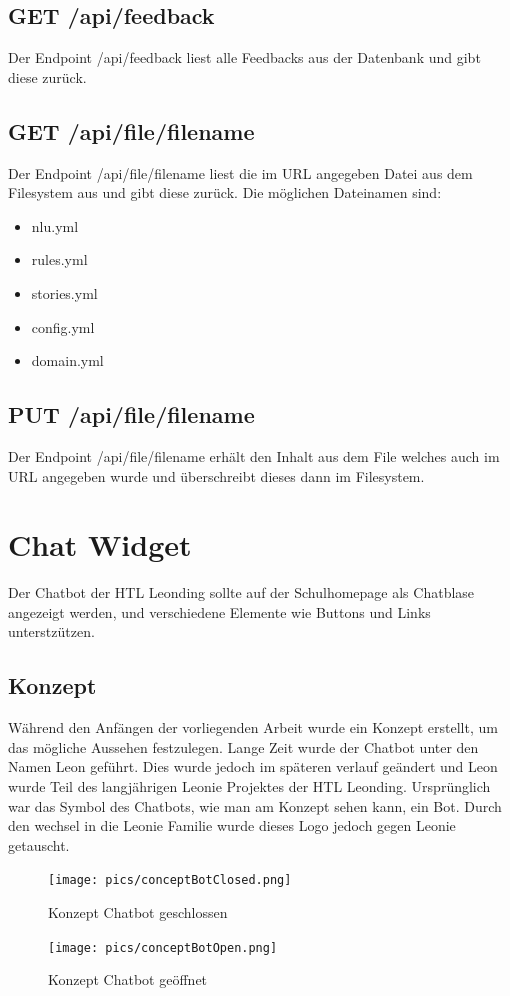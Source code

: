 \subsection{GET /api/feedback}
Der Endpoint /api/feedback liest alle Feedbacks aus der Datenbank und gibt diese zurück.

\subsection{GET /api/file/{filename}}
Der Endpoint /api/file/{filename} liest die im URL angegeben Datei aus dem Filesystem aus und gibt diese zurück.
Die möglichen Dateinamen sind:

\begin{itemize}
    \item nlu.yml
    \item rules.yml
    \item stories.yml
    \item config.yml
    \item domain.yml
\end{itemize}

\subsection{PUT /api/file/{filename}}
Der Endpoint /api/file/{filename} erhält den Inhalt aus dem File welches auch im URL angegeben wurde und überschreibt dieses dann im Filesystem.

\section{Chat Widget}\label{sec:chat-widget}
Der Chatbot der HTL Leonding sollte auf der Schulhomepage als Chatblase angezeigt werden, und verschiedene Elemente wie Buttons und Links unterstzützen.

\subsection{Konzept}
Während den Anfängen der vorliegenden Arbeit wurde ein Konzept erstellt, um das mögliche Aussehen festzulegen. Lange Zeit wurde der Chatbot unter den Namen Leon geführt.
Dies wurde jedoch im späteren verlauf geändert und Leon wurde Teil des langjährigen Leonie Projektes der HTL Leonding.
Ursprünglich war das Symbol des Chatbots, wie man am Konzept sehen kann, ein Bot. Durch den wechsel in die Leonie Familie wurde dieses Logo jedoch gegen Leonie getauscht.
\begin{figure}[hbt!]
    \centering
    \texttt{[image: pics/conceptBotClosed.png]}
    \caption{Konzept Chatbot geschlossen}
    \label{fig:impl:conceptBotClosed}
\end{figure}
\begin{figure}[hbt!]
    \centering
    \texttt{[image: pics/conceptBotOpen.png]}
    \caption{Konzept Chatbot geöffnet}
    \label{fig:impl:conceptBotOpen}
\end{figure}

